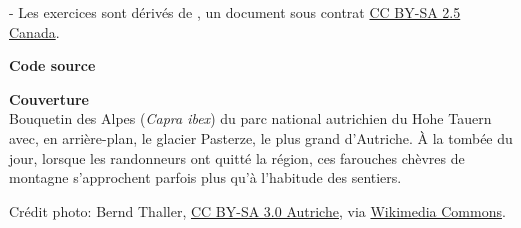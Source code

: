 \begin{adjustwidth*}{\unitlength}{-\unitlength}
  Les exercices sont dérivés de \citet{Cossette:credibilite:2008}, un
  document sous contrat
  \href{http://creativecommons.org/licenses/by-sa/2.5/ca/}{%
    CC BY-SA 2.5 Canada}.

  \textbf{Code source} \\
  \viewsource{\ghurl}

  \textbf{Couverture} \\
  Bouquetin des Alpes (\emph{Capra ibex}) du parc national autrichien
  du Hohe Tauern avec, en arrière-plan, le glacier Pasterze, le plus
  grand d'Autriche. À la tombée du jour, lorsque les randonneurs ont
  quitté la région, ces farouches chèvres de montagne s'approchent
  parfois plus qu'à l'habitude des sentiers.

  Crédit photo: {\textcopyright} Bernd Thaller,
  \href{https://creativecommons.org/licenses/by-sa/3.0/at/deed.en}{CC
    BY-SA 3.0 Autriche}, via
  \href{https://commons.wikimedia.org/w/index.php?curid=40071439}{Wikimedia
    Commons}.
\end{adjustwidth*}
\endgroup

